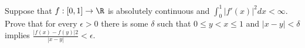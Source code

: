 Suppose that $f:[0,1]\rightarrow \R$ is absolutely continuous and
$\int_0^1|f'(x)|^2 dx<\infty$. Prove that for every $\epsilon>0$ there
is some $\delta$ such that $0\leq y<x\leq 1$ and $|x-y|<\delta$
implies $\frac{|f(x)-f(y)|2}{|x-y|}<\epsilon$.
